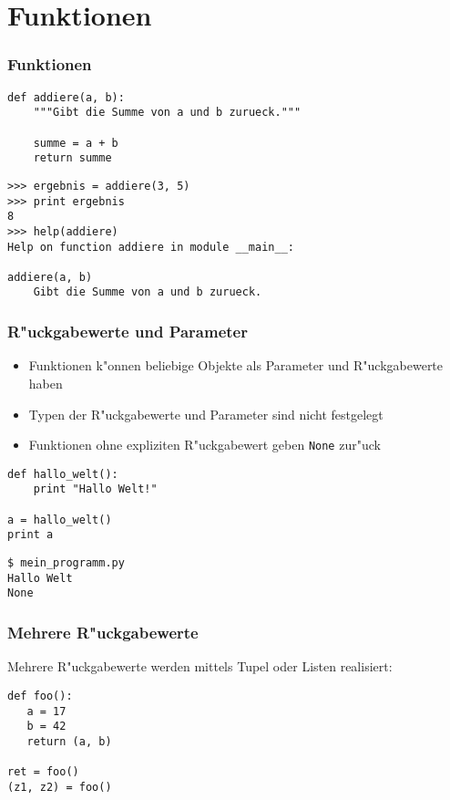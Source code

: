\section{Funktionen}

\begin{frame}[fragile]
\frametitle{Funktionen}
\begin{lstlisting}[style=Python]
def addiere(a, b):
    """Gibt die Summe von a und b zurueck."""

    summe = a + b
    return summe
\end{lstlisting}

\begin{lstlisting}[style=Shell]
>>> ergebnis = addiere(3, 5)
>>> print ergebnis
8
>>> help(addiere)
Help on function addiere in module __main__:

addiere(a, b)
    Gibt die Summe von a und b zurueck.
\end{lstlisting}
\end{frame}

\begin{frame}[fragile]
\frametitle{R"uckgabewerte und Parameter}
\begin{itemize}
\item Funktionen k"onnen beliebige Objekte als Parameter und R"uckgabewerte haben
\item Typen der R"uckgabewerte und Parameter sind nicht festgelegt
\item Funktionen ohne expliziten R"uckgabewert geben \texttt{None} zur"uck
\end{itemize}
\begin{lstlisting}[style=Python]
def hallo_welt():
    print "Hallo Welt!"

a = hallo_welt()
print a
\end{lstlisting}
\begin{lstlisting}[style=Shell]
$ mein_programm.py
Hallo Welt
None
\end{lstlisting} %
\end{frame}

\begin{frame}[fragile]
\frametitle{Mehrere R"uckgabewerte}
Mehrere R"uckgabewerte werden mittels Tupel oder Listen realisiert:
\begin{lstlisting}[style=Python]
def foo():
   a = 17
   b = 42
   return (a, b)

ret = foo()
(z1, z2) = foo()
\end{lstlisting}
\end{frame}


